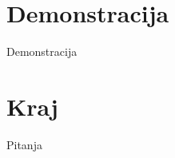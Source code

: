 \documentclass[utf8]{beamer}
\begin{document}
\section{Demonstracija}

\begin{frame}{Demonstracija}
\end{frame}

\section*{Kraj}

\begin{frame}{Pitanja}
\end{frame}
\end{document}
